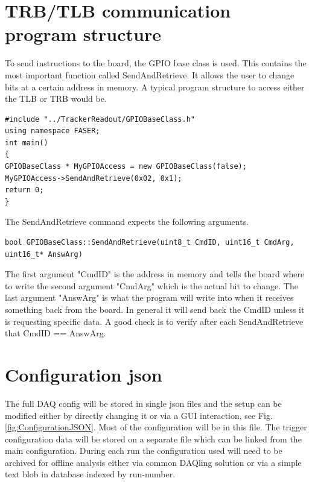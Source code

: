 \section{TRB/TLB communication program structure}

To send instructions to the board, the GPIO base class is used. This contains the most important function called SendAndRetrieve. It allows the user to change bits at a certain address in memory. A typical program structure to access either the TLB or TRB would be. 

\begin{lstlisting}[caption={In this example, SendAndRetrieve has two parameters: 0x02 and 0x1. 0x02 corresponds to the address in memory and 0x01 corresponds to the payload.},captionpos=b]
#include "../TrackerReadout/GPIOBaseClass.h"
using namespace FASER;
int main() 
{
GPIOBaseClass * MyGPIOAccess = new GPIOBaseClass(false);
MyGPIOAccess->SendAndRetrieve(0x02, 0x1);
return 0;
}
\end{lstlisting}

The SendAndRetrieve command expects the following arguments. \begin{lstlisting}
bool GPIOBaseClass::SendAndRetrieve(uint8_t CmdID, uint16_t CmdArg, uint16_t* AnswArg)
\end{lstlisting}
The first argument "CmdID" is the address in memory and tells the board where to write the second argument "CmdArg" which is the actual bit to change. The last argument "AnswArg" is what the program will write into when it receives something back from the board. In general it will send back the CmdID unless it is requesting specific data. A good check is to verify after each SendAndRetrieve that CmdID == AnswArg.

\section{Configuration json}
\label{configuration}

The full DAQ config will be stored in single json files and the setup can be modified either by directly changing it or via a GUI interaction, see Fig.\ref{fig:ConfigurationJSON}. Most of the configuration will be in this file. The trigger configuration data will be stored on a separate file which can be linked from the main configuration. During each run the configuration used will need to be archived for offline analysis either via common DAQling solution or via a simple text blob in database indexed by run-number.

